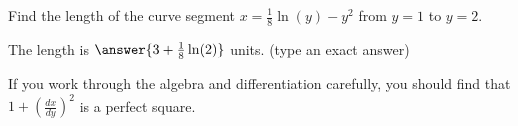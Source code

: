 \documentclass{ximera}
\author{Jim Talamo}
\begin{document}
\begin{exercise}

Find the length of the curve segment $x=\frac{1}{8} \ln(y)-y^2$ from $y=1$ to $y=2$.

The length is $\answer{3+\frac{1}{8} \ln(2)}$ units. (type an exact answer)


\begin{hint}
If you work through the algebra and differentiation carefully, you should find that $1+\left(\frac{dx}{dy}\right)^2$ is a perfect square. 
\end{hint}

\end{exercise}
\end{document}
